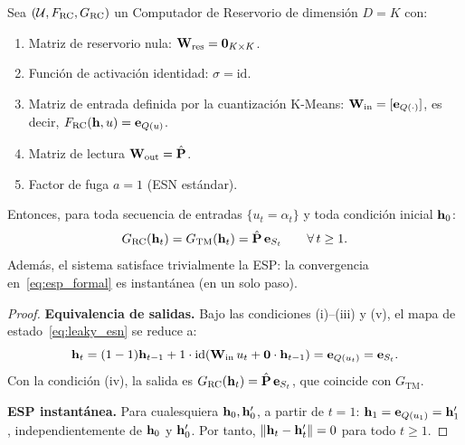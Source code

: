 \begin{theorem}
\label{teo:inclusion}
Sea $(\mathcal{U}, F_{\text{RC}}, G_{\text{RC}})$ un Computador de
Reservorio de dimensión $D = K$ con:
\begin{enumerate}
    \item[(i)] Matriz de reservorio nula:
    $\mathbf{W}_{\text{res}} = \mathbf{0}_{K \times K}$.
    \item[(ii)] Función de activación identidad:
    $\sigma = \mathrm{id}$.
    \item[(iii)] Matriz de entrada definida por la cuantización
    K-Means: $\mathbf{W}_{\text{in}} = [\mathbf{e}_{Q(\cdot)}]$,
    es decir, $F_{\text{RC}}(\mathbf{h}, u) = \mathbf{e}_{Q(u)}$.
    \item[(iv)] Matriz de lectura
    $\mathbf{W}_{\text{out}} = \hat{\mathbf{P}}$.
    \item[(v)] Factor de fuga $a = 1$ (ESN estándar).
\end{enumerate}
Entonces, para toda secuencia de entradas $\{u_t = \alpha_t\}$ y
toda condición inicial $\mathbf{h}_0$:
\begin{equation}
    G_{\text{RC}}(\mathbf{h}_t) = G_{\text{TM}}(\mathbf{h}_t) =
    \hat{\mathbf{P}}\,\mathbf{e}_{S_t} \qquad \forall\, t \ge 1.
    \label{eq:equivalencia_sistemas}
\end{equation}
Además, el sistema satisface trivialmente la ESP: la convergencia
en~\eqref{eq:esp_formal} es instantánea (en un solo paso).
\end{theorem}

\begin{proof}
\textbf{Equivalencia de salidas.}  Bajo las condiciones
(i)--(iii) y (v), el mapa de estado~\eqref{eq:leaky_esn} se
reduce a:
\begin{equation}
    \mathbf{h}_t = (1-1)\mathbf{h}_{t-1} + 1 \cdot \mathrm{id}\!\left(
    \mathbf{W}_{\text{in}}\,u_t + \mathbf{0}\cdot\mathbf{h}_{t-1}
    \right) = \mathbf{e}_{Q(u_t)} = \mathbf{e}_{S_t}.
\end{equation}
Con la condición (iv), la salida es
$G_{\text{RC}}(\mathbf{h}_t) =
\hat{\mathbf{P}}\,\mathbf{e}_{S_t}$, que coincide con
$G_{\text{TM}}$.

\textbf{ESP instantánea.}  Para cualesquiera
$\mathbf{h}_0, \mathbf{h}_0'$, a partir de $t = 1$:
$\mathbf{h}_1 = \mathbf{e}_{Q(u_1)} = \mathbf{h}_1'$,
independientemente de $\mathbf{h}_0$ y $\mathbf{h}_0'$.  Por tanto,
$\|\mathbf{h}_t - \mathbf{h}_t'\| = 0$ para todo $t \ge 1$.
\end{proof}

